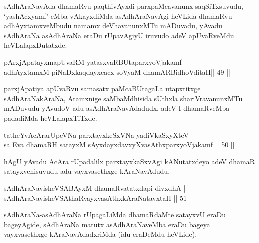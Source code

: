 \begin{artha}
sAdhAraNavAda dhamaRvu paqthivAyxdi parxpaMcavanunx saqSiTxsuvudu, `yashAcxyamf' eMba vAkayxdiMda asAdhAraNavAgi heVLida dhamaRvu adhAyxtamxveMbudu namamx deVha\-vanunxMTu mADuvadu, yAvadu sAdhAraNa asAdhAraNa  eraDu rUpavAgiyU iruvudo adeV apUvaRveMdu heVLalapxDutatxde.
\end{artha}

\begin{shl}
pArxjApatayxmapUvaRM yatasxvaRBUtaparxyoVjakamf |\\
adhAyxtamxM piNaDxkaqdayxcacx soV\s yaM dhamARBidhoVditaH\hfill  || 49 ||
\end{shl}

\begin{artha}
parxjApatiya apUvaRvu samasatx paMcaBUtagaLa utapxtitxge
sAdhAraNakAraNa, Atamxnige saMbaMdhisida sUthxla shariVravanunxMTu
mADuvudu yAvudoV adu asAdhAraNavAdadudx, adeV I dhamaRveMba padadiMda heVLalapxTiTxde.
\end{artha}


\begin{shl}
tatheYvA\s \s cArarUpeVNa parxtayxkeSxVNa yadiVkaSxyXteV |\\
sa Eva  dhamaRH satayxM sAyxdayxdavxyXvasAthxparxyoVjakamf \hfill || 50 ||
\end{shl}

\begin{artha}
hAgU yAvadu AcAra rUpadalilx parxtayxkaSxvAgi kANutatxdeyo adeV dhamaR satayxvenisuvudu adu vayxvasethxge kAraNavAdudu.
\end{artha}


\begin{shl}
sAdhAraNavisheVSABAyxM dhamaRvatatxdapi divxdhA |\\
sAdhAraNavisheVSAthaRvayx\footnotemark[1]vasAthxkAraNatavxtaH \hfill || 51 ||
\end{shl}

\begin{artha}
sAdhAraNa-asAdhAraNa rUpagaLiMda dhamaRdaMte satayxvU eraDu bageyAgide, sAdhAraNa matutx asAdhAraNaveMba eraDu bageya vayxvasethxge kAraNavAdadxriMda (idu eraDeMdu heVLide).
\end{artha}

